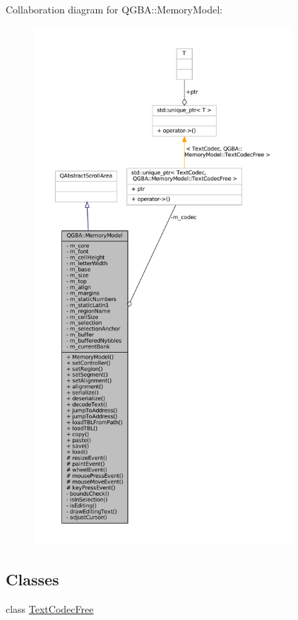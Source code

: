 Collaboration diagram for Q\+G\+BA\+:\+:Memory\+Model\+:
\nopagebreak
\begin{figure}[H]
\begin{center}
\leavevmode
\includegraphics[height=550pt]{class_q_g_b_a_1_1_memory_model__coll__graph}
\end{center}
\end{figure}
\subsection*{Classes}
\begin{DoxyCompactItemize}
\item 
class \mbox{\hyperlink{class_q_g_b_a_1_1_memory_model_1_1_text_codec_free}{Text\+Codec\+Free}}
\end{DoxyCompactItemize}

